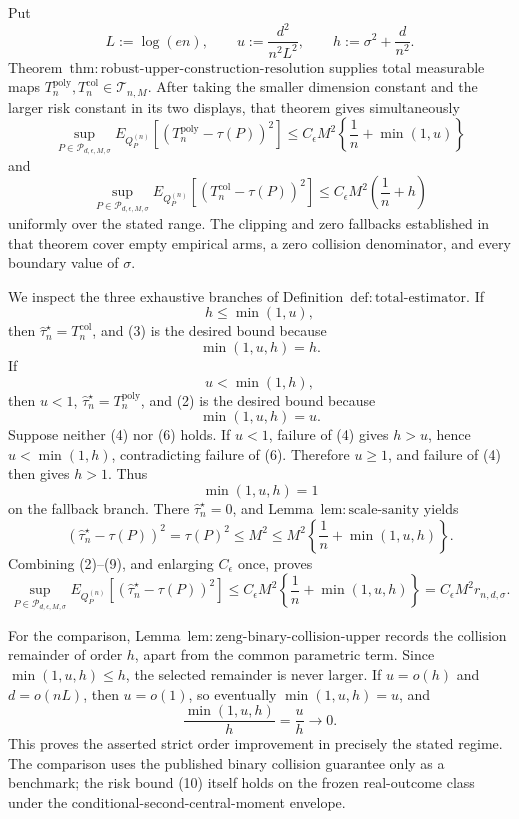 Put
\[
 L:=\log(en),\qquad
 u:=\frac{d^2}{n^2L^2},\qquad
 h:=\sigma^2+\frac d{n^2}.
\tag{1}
\]
Theorem~\(\mathrm{thm:robust\text{-}upper\text{-}construction\text{-}resolution}\) supplies total measurable maps \(T_n^{\mathrm{poly}},T_n^{\mathrm{col}}\in\mathcal T_{n,M}\).  After taking the smaller dimension constant and the larger risk constant in its two displays, that theorem gives simultaneously
\[
 \sup_{P\in\mathcal P_{d,\epsilon,M,\sigma}}
 E_{Q_P^{(n)}}[(T_n^{\mathrm{poly}}-\tau(P))^2]
 \le C_{\epsilon}M^2\left\{\frac1n+\min(1,u)\right\}
\tag{2}
\]
and
\[
 \sup_{P\in\mathcal P_{d,\epsilon,M,\sigma}}
 E_{Q_P^{(n)}}[(T_n^{\mathrm{col}}-\tau(P))^2]
 \le C_{\epsilon}M^2\left(\frac1n+h\right)
\tag{3}
\]
uniformly over the stated range.  The clipping and zero fallbacks established in that theorem cover empty empirical arms, a zero collision denominator, and every boundary value of \(\sigma\).

We inspect the three exhaustive branches of Definition~\(\mathrm{def:total\text{-}estimator}\).  If
\[
 h\le\min(1,u),
\tag{4}
\]
then \(\widehat\tau_n^{\star}=T_n^{\mathrm{col}}\), and (3) is the desired bound because
\[
 \min(1,u,h)=h.
\tag{5}
\]
If
\[
 u<\min(1,h),
\tag{6}
\]
then \(u<1\), \(\widehat\tau_n^{\star}=T_n^{\mathrm{poly}}\), and (2) is the desired bound because
\[
 \min(1,u,h)=u.
\tag{7}
\]
Suppose neither (4) nor (6) holds.  If \(u<1\), failure of (4) gives \(h>u\), hence \(u<\min(1,h)\), contradicting failure of (6).  Therefore \(u\ge1\), and failure of (4) then gives \(h>1\).  Thus
\[
 \min(1,u,h)=1
\tag{8}
\]
on the fallback branch.  There \(\widehat\tau_n^{\star}=0\), and Lemma~\(\mathrm{lem:scale\text{-}sanity}\) yields
\[
 (\widehat\tau_n^{\star}-\tau(P))^2
 =\tau(P)^2
 \le M^2
 \le M^2\left\{\frac1n+\min(1,u,h)\right\}.
\tag{9}
\]
Combining (2)--(9), and enlarging \(C_{\epsilon}\) once, proves
\[
 \sup_{P\in\mathcal P_{d,\epsilon,M,\sigma}}
 E_{Q_P^{(n)}}[(\widehat\tau_n^{\star}-\tau(P))^2]
 \le C_{\epsilon}M^2
 \left\{\frac1n+\min(1,u,h)\right\}
 =C_{\epsilon}M^2r_{n,d,\sigma}.
\tag{10}
\]

For the comparison, Lemma~\(\mathrm{lem:zeng\text{-}binary\text{-}collision\text{-}upper}\) records the collision remainder of order \(h\), apart from the common parametric term.  Since \(\min(1,u,h)\le h\), the selected remainder is never larger.  If \(u=o(h)\) and \(d=o(nL)\), then \(u=o(1)\), so eventually \(\min(1,u,h)=u\), and
\[
 \frac{\min(1,u,h)}{h}=\frac uh\longrightarrow0.
\tag{11}
\]
This proves the asserted strict order improvement in precisely the stated regime.  The comparison uses the published binary collision guarantee only as a benchmark; the risk bound (10) itself holds on the frozen real-outcome class under the conditional-second-central-moment envelope.